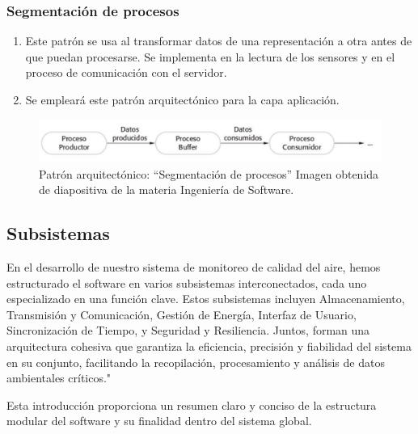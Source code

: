 \documentclass[
11pt, %
codirector, %
]{charter}
\begin{document}
\subsubsection{Segmentación de procesos}
\begin{enumerate}
\item Este patrón se usa al transformar datos de una representación a otra antes de que puedan procesarse. Se implementa en la lectura de los sensores y en el proceso de comunicación con el servidor.
\item Se empleará este patrón arquitectónico para la capa aplicación.
\end{enumerate}

\begin{figure}[bph!]
	\centering
	\includegraphics[width=0.9\linewidth]{Figuras/PatronSegmentacionProcesos}
	\caption{ Patrón arquitectónico: “Segmentación de procesos” Imagen obtenida de diapositiva de la materia Ingeniería de Software.}
	\label{fig:patronsegmentacionprocesos}
\end{figure}




\newpage

\subsection{Subsistemas}

En el desarrollo de nuestro sistema de monitoreo de calidad del aire, hemos estructurado el software en varios subsistemas interconectados, cada uno especializado en una función clave. Estos subsistemas incluyen Almacenamiento, Transmisión y Comunicación, Gestión de Energía, Interfaz de Usuario, Sincronización de Tiempo, y Seguridad y Resiliencia. Juntos, forman una arquitectura cohesiva que garantiza la eficiencia, precisión y fiabilidad del sistema en su conjunto, facilitando la recopilación, procesamiento y análisis de datos ambientales críticos."

Esta introducción proporciona un resumen claro y conciso de la estructura modular del software y su finalidad dentro del sistema global.
\end{document}
